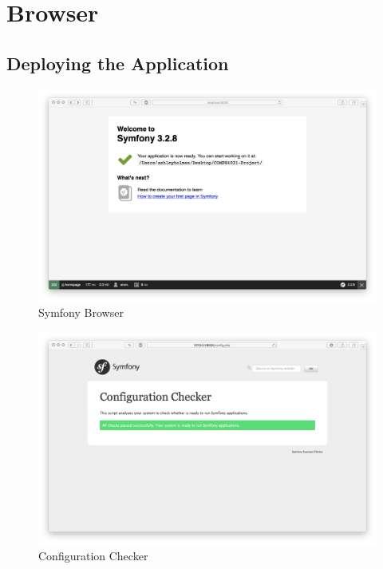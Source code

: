 \section{Browser}

\subsection{Deploying the Application}

\begin{figure}[htbp]
   \centering
   \includegraphics[width=400pt]{figures/symfony_browser.png} %
   \caption{Symfony Browser}
   \label{fig:Symfony Browser}
\end{figure}

\begin{figure}[htbp]
   \centering
   \includegraphics[width=400pt]{figures/configuration_checker.png} %
   \caption{Configuration Checker}
   \label{fig:Configuration Checker}
\end{figure}

